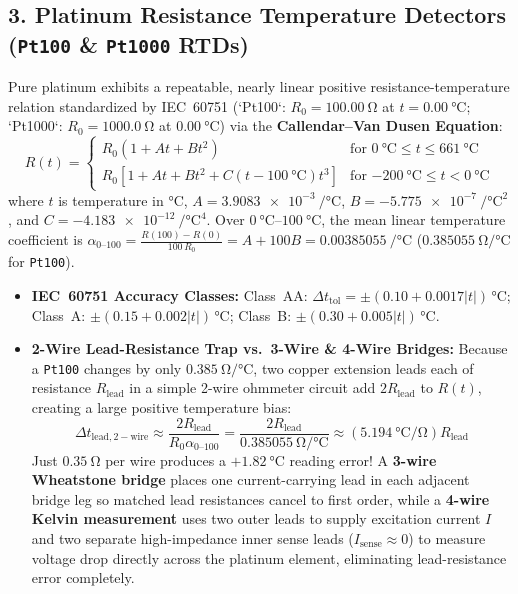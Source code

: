 \subsection{3. Platinum Resistance Temperature Detectors (\texttt{Pt100} \& \texttt{Pt1000} RTDs)}
Pure platinum exhibits a repeatable, nearly linear positive resistance-temperature relation standardized by IEC~60751 (`Pt100`: $R_0 = \SI{100.00}{\ohm}$ at $t = \SI{0.00}{\celsius}$; `Pt1000`: $R_0 = \SI{1000.0}{\ohm}$ at $\SI{0.00}{\celsius}$) via the \textbf{Callendar--Van Dusen Equation}:
\begin{equation}\label{eq:17:cvd}
  R(t) = \begin{cases}
    R_0\left(1 + A t + B t^2\right) & \text{for }\SI{0}{\celsius} \le t \le \SI{661}{\celsius} \\[2pt]
    R_0\left[1 + A t + B t^2 + C(t - \SI{100}{\celsius})t^3\right] & \text{for }\SI{-200}{\celsius} \le t < \SI{0}{\celsius}
  \end{cases}
\end{equation}
where $t$ is temperature in $\si{\celsius}$, $A = \SI{3.9083e-3}{\per\celsius}$, $B = \SI{-5.775e-7}{\per\square\celsius}$, and $C = \SI{-4.183e-12}{\per\celsius\tothe{4}}$. Over $\SIrange{0}{100}{\celsius}$, the mean linear temperature coefficient is $\alpha_{0\text{--}100} = \frac{R(100) - R(0)}{100\,R_0} = A + 100B = \SI{0.00385055}{\per\celsius}$ ($\SI{+0.385055}{\ohm\per\celsius}$ for \texttt{Pt100}).
\begin{itemize}
  \item \textbf{IEC~60751 Accuracy Classes:} Class~AA: $\Delta t_{\mathrm{tol}} = \pm(0.10 + 0.0017|t|)\,\si{\celsius}$; Class~A: $\pm(0.15 + 0.002|t|)\,\si{\celsius}$; Class~B: $\pm(0.30 + 0.005|t|)\,\si{\celsius}$.
  \item \textbf{2-Wire Lead-Resistance Trap vs.\ 3-Wire \& 4-Wire Bridges:}  Because a \texttt{Pt100} changes by only $\SI{0.385}{\ohm\per\celsius}$, two copper extension leads each of resistance $R_{\mathrm{lead}}$ in a simple 2-wire ohmmeter circuit add $2R_{\mathrm{lead}}$ to $R(t)$, creating a large positive temperature bias:
  \begin{equation}\label{eq:17:rtdlead}
    \Delta t_{\mathrm{lead,2-wire}} \approx \frac{2 R_{\mathrm{lead}}}{R_0 \alpha_{0\text{--}100}} = \frac{2 R_{\mathrm{lead}}}{\SI{0.385055}{\ohm\per\celsius}} \approx \left(\SI{5.194}{\celsius\per\ohm}\right) R_{\mathrm{lead}}
  \end{equation}
  Just $\SI{0.35}{\ohm}$ per wire produces a $+\SI{1.82}{\celsius}$ reading error! A \textbf{3-wire Wheatstone bridge} places one current-carrying lead in each adjacent bridge leg so matched lead resistances cancel to first order, while a \textbf{4-wire Kelvin measurement} uses two outer leads to supply excitation current $I$ and two separate high-impedance inner sense leads ($I_{\mathrm{sense}} \approx 0$) to measure voltage drop directly across the platinum element, eliminating lead-resistance error completely.
\end{itemize}

